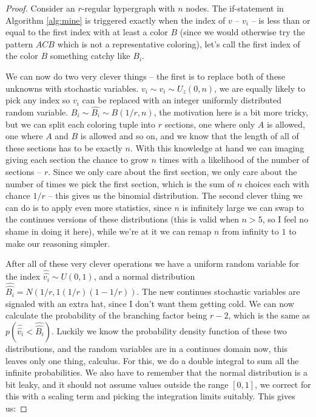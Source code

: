\documentclass{article}
\begin{document}
\begin{proof}
Consider an $r$-regular hypergraph with $n$ nodes. The if-statement in Algorithm \ref{alg:mine} is triggered exactly when the index of $v$ -- $v_i$ -- is less than or equal to the first index with at least a color $B$ (since we would otherwise try the pattern $ACB$ which is not a representative coloring), let's call the first index of the color $B$ something catchy like $B_i$.

We can now do two very clever things -- the first is to replace both of these unknowns with stochastic variables. $v_i \sim \hat{v_i} \sim U_z(0, n)$, we are equally likely to pick any index so $v_i$ can be replaced with an integer uniformly distributed random variable. $B_i \sim \hat{B_i} \sim B(1/r, n)$, the motivation here is a bit more tricky, but we can split each coloring tuple into $r$ sections, one where only $A$ is allowed, one where $A$ and $B$ is allowed and so on, and we know that the length of all of these sections has to be exactly $n$. With this knowledge at hand we can imaging giving each section the chance to grow $n$ times with a likelihood of the number of sections -- $r$. Since we only care about the first section, we only care about the number of times we pick the first section, which is the sum of $n$ choices each with chance $1/r$ -- this gives us the binomial distribution. The second clever thing we can do is to apply even more statistics, since $n$ is infinitely large we can swap to the continues versions of these distributions (this is valid when $n > 5$, so I feel no shame in doing it here), while we're at it we can remap $n$ from infinity to $1$ to make our reasoning simpler. 

After all of these very clever operations we have a uniform random variable for the index $\hat{\hat{v_{i}}} \sim U(0, 1)$, and a normal distribution $\hat{\hat{B_i}} = N(1/r, 1(1/r)(1 - 1/r))$. The new continues stochastic variables are signaled with an extra hat, since I don't want them getting cold. We can now calculate the probability of the branching factor being $r - 2$, which is the same as $p(\hat{\hat{v_{i}}} < \hat{\hat{B_i}})$. Luckily we know the probability density function of these two distributions, and the random variables are in a continues domain now, this leaves only one thing, calculus. For this, we do a double integral to sum all the infinite probabilities. We also have to remember that the normal distribution is a bit leaky, and it should not assume values outside the range $[0, 1]$, we correct for this with a scaling term and picking the integration limits suitably. This gives us:


\end{proof}
\end{document}
